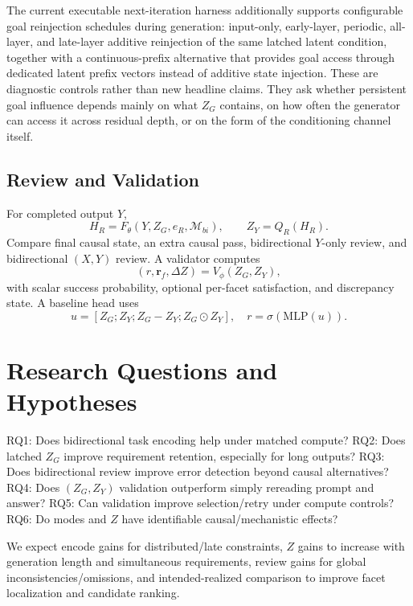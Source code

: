 \documentclass[11pt]{article}
\begin{document}
The current executable next-iteration harness additionally supports configurable goal reinjection schedules during generation: input-only, early-layer, periodic, all-layer, and late-layer additive reinjection of the same latched latent condition, together with a continuous-prefix alternative that provides goal access through dedicated latent prefix vectors instead of additive state injection. These are diagnostic controls rather than new headline claims. They ask whether persistent goal influence depends mainly on what $Z_G$ contains, on how often the generator can access it across residual depth, or on the form of the conditioning channel itself.

\subsection{Review and Validation}
For completed output $Y$,
\begin{equation}
H_R=F_\theta(Y,Z_G,e_R,\mathcal M_{bi}),\qquad Z_Y=Q_R(H_R).
\end{equation}
Compare final causal state, an extra causal pass, bidirectional $Y$-only review, and bidirectional $(X,Y)$ review. A validator computes
\begin{equation}
(r,\mathbf r_f,\Delta Z)=V_\phi(Z_G,Z_Y),
\end{equation}
with scalar success probability, optional per-facet satisfaction, and discrepancy state. A baseline head uses
\begin{equation}
u=[Z_G;Z_Y;Z_G-Z_Y;Z_G\odot Z_Y],\quad r=\sigma(\mathrm{MLP}(u)).
\end{equation}

\section{Research Questions and Hypotheses}
RQ1: Does bidirectional task encoding help under matched compute? RQ2: Does latched $Z_G$ improve requirement retention, especially for long outputs? RQ3: Does bidirectional review improve error detection beyond causal alternatives? RQ4: Does $(Z_G,Z_Y)$ validation outperform simply rereading prompt and answer? RQ5: Can validation improve selection/retry under compute controls? RQ6: Do modes and $Z$ have identifiable causal/mechanistic effects?

We expect encode gains for distributed/late constraints, $Z$ gains to increase with generation length and simultaneous requirements, review gains for global inconsistencies/omissions, and intended-realized comparison to improve facet localization and candidate ranking.
\end{document}
